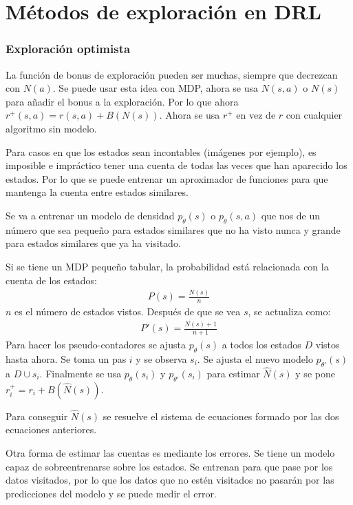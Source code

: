 \section{Métodos de exploración en DRL}%
\label{sec:métodos_de_exploración_en_drl}

\subsubsection{Exploración optimista}%
\label{ssub:exploración_optimista}

La función de bonus de exploración pueden ser muchas, siempre que decrezcan con $N(a)$. Se puede
usar esta idea con MDP, ahora se usa  $N(s,a)$ o $N(s)$ para añadir el bonus a la exploración.
Por lo que ahora $r^+(s,a)=r(s,a)+B(N(s))$. Ahora se usa  $r^+$ en vez de $r$ con cualquier
algoritmo sin modelo.

Para casos en que los estados sean incontables (imágenes por ejemplo), es imposible e
impráctico tener una cuenta de todas las veces que han aparecido los estados. Por lo
que se puede entrenar un aproximador de funciones para que mantenga la cuenta entre estados
similares.

Se va a entrenar un modelo de densidad $p_\theta(s)$ o $p_\theta(s,a)$ que nos de un número que
sea pequeño para estados similares que no ha visto nunca y grande para estados similares que ya ha visitado. 

Si se tiene un MDP pequeño tabular, la probabilidad está relacionada con la cuenta de los
estados:
\begin{align}
    P(s)= \frac{N(s)}{n} 
\end{align}
$n$ es el número de estados vistos. Después de que se vea $s$, se actualiza como:
\begin{align}
    P'(s)= \frac{N(s)+1}{n+1} 
\end{align}
Para hacer los pseudo-contadores se ajusta $p_\theta(s)$ a todos los estados $D$ vistos hasta
ahora. Se toma un pas $i$ y se observa $s_i$. Se ajusta el nuevo modelo $p_{\theta'}(s)$ a
$D \cup s_i$. Finalmente se usa $p_\theta(s_i)$ y $p_{\theta'}(s_i)$ para estimar
$\hat{N}(s)$ y se pone $r^+_i=r_i+B(\hat{N}(s))$. 

Para conseguir $\hat{N}(s)$ se resuelve el sistema de ecuaciones formado por las dos ecuaciones
anteriores.

Otra forma de estimar las cuentas es mediante los errores. Se tiene un modelo capaz de
sobreentrenarse sobre los estados. Se entrenan para que pase por los datos visitados, por lo
que los datos que no estén visitados no pasarán por las predicciones del modelo y se puede
medir el error.

